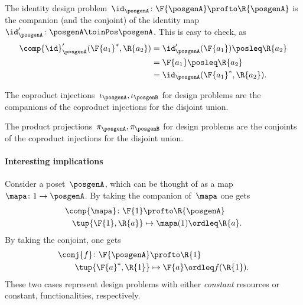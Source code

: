 \begin{example}
    The identity design problem~$\id_\posgenA\colon \F{\posgenA} \profto \R{\posgenA}$ is the companion (and the conjoint) of the identity map~$\id_\posgenA'\colon \posgenA \toinPos \posgenA$.
    This is easy to check, as
    \begin{equation}
        \begin{aligned}
            \comp{\id}_\posgenA'(\F{a_1}^*,\R{a_2})&=\id_\posgenA'(\F{a_1})\posleq \R{a_2}\\
            &=\F{a_1}\posleq \R{a_2}\\
            &=\id_\posgenA(\F{a_1}^*,\R{a_2}).
        \end{aligned}
    \end{equation}
\end{example}

\begin{example}
    The coproduct injections~$\iota_\posgenA, \iota_\posgenB$ for design problems are the companions of the coproduct injections for the disjoint union.
\end{example}

\begin{example}
    The product projections~$\pi_\posgenA, \pi_\posgenB$ for design problems are the conjoints of the coproduct injections for the disjoint union.
\end{example}

\paragraph{Interesting implications}
Consider a poset~$\posgenA$, which can be thought of as a map~$\mapa \colon 1\to \posgenA$. By taking the companion of~$\mapa$ one gets
\begin{equation}
    \begin{aligned}
        \comp{\mapa}\colon \F{1}&\profto \R{\posgenA}\\
        \tup{\F{1},\R{a}}&\mapsto \mapa(1)\ordleq \R{a}.
    \end{aligned}
\end{equation}
By taking the conjoint, one gets
\begin{equation}
    \begin{aligned}
        \conj{f}\colon \F{\posgenA}&\profto \R{1}\\
        \tup{\F{a}^*,\R{1}}&\mapsto \F{a}\ordleq f(\R{1}).
    \end{aligned}
\end{equation}
These two cases represent design problems with either \emph{constant} resources or constant, functionalities, respectively.

